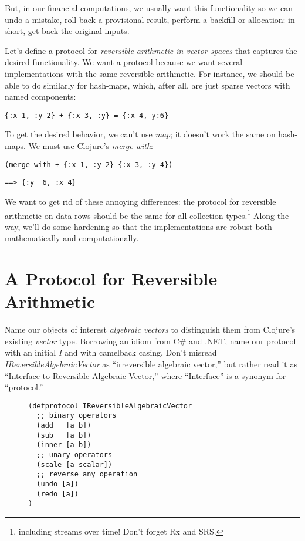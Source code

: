 \documentclass[11pt]{article}
\begin{document}
But, in our financial computations, we usually want this functionality
so we can undo a mistake, roll back a provisional result, perform a
backfill or allocation: in short, get back the original inputs.

Let's define a protocol for \emph{reversible arithmetic in vector spaces}
that captures the desired functionality.  We want a protocol because we
want several implementations with the same reversible arithmetic.  For
instance, we should be able to do similarly for hash-maps, which, after
all, are just sparse vectors with named components:
\begin{verbatim}
{:x 1, :y 2} + {:x 3, :y} = {:x 4, y:6}
\end{verbatim}

To get the desired behavior, we can't use \emph{map}; it doesn't work the
same on hash-maps.  We must use Clojure's \emph{merge-with}:
\begin{verbatim}
(merge-with + {:x 1, :y 2} {:x 3, :y 4})
\end{verbatim}
\begin{verbatim}
==> {:y  6, :x 4}
\end{verbatim}

We want to get rid of these annoying differences: the protocol for
reversible arithmetic on data rows should be the same for all collection
types.\footnote{including streams over time! Don't forget Rx and SRS.}  Along
the way, we'll do some hardening so that the implementations are robust
both mathematically and computationally.
\section{A Protocol for Reversible Arithmetic}
\label{sec-2}

Name our objects of interest \emph{algebraic vectors} to distinguish
them from Clojure's existing \emph{vector} type.  Borrowing an idiom from C\#
and .NET, name our protocol with an initial \emph{I} and with camelback
casing.  Don't misread \emph{IReversibleAlgebraicVector} as ``irreversible
algebraic vector,'' but rather read it as ``Interface to Reversible
Algebraic Vector,'' where ``Interface'' is a synonym for ``protocol.''

\begin{figure}[H]
\label{reversible-algebraic-vector-protocol}
\begin{verbatim}
(defprotocol IReversibleAlgebraicVector
  ;; binary operators
  (add   [a b])
  (sub   [a b])
  (inner [a b])
  ;; unary operators
  (scale [a scalar])
  ;; reverse any operation
  (undo [a])
  (redo [a])
)
\end{verbatim}
\end{figure}
\end{document}
